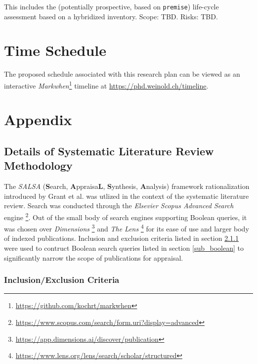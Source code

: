 \documentclass{article}
\begin{document}
    This includes the (potentially prospective, based on \texttt{premise}) life-cycle assessment based on a hybridized inventory. Scope: TBD. Risks: TBD.
    
\section{Time Schedule}

    The proposed schedule associated with this research plan can be viewed as an interactive \textit{Markwhen}\footnote{\url{https://github.com/kochrt/markwhen}} timeline at \url{https://phd.weinold.ch/timeline}.

\newpage
\section{Appendix}


    \subsection{Details of Systematic Literature Review Methodology}
    
        The \textit{SALSA} (\textbf{S}earch, \textbf{A}ppraisa\textbf{L}, \textbf{S}ynthesis, \textbf{A}nalysis) framework rationalization introduced by Grant et al. \cite{grant_typology_2009} was utlized in the context of the systematic literature review. Search was conducted through the \textit{Elsevier Scopus Advanced Search} engine \footnote{\url{https://www.scopus.com/search/form.uri?display=advanced}}. Out of the small body of search engines supporting Boolean queries, it was chosen over \textit{Dimensions} \footnote{\url{https://app.dimensions.ai/discover/publication}} and \textit{The Lens} \footnote{\url{https://www.lens.org/lens/search/scholar/structured}} for its ease of use and larger body of indexed publications. Inclusion and exclusion criteria listed in section \ref{subsub_inclusion_exclusion} were used to contruct Boolean search queries listed in section \ref{sub_boolean} to significantly narrow the scope of publications for appraisal. 
        
        \subsubsection{Inclusion/Exclusion Criteria}
        \label{subsub_inclusion_exclusion}
        
\end{document}

